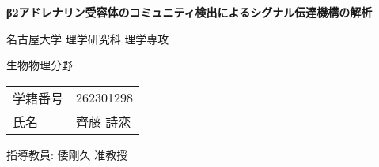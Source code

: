 \begin{titlepage}
    \centering
    \fontsize{24pt}{28pt}\selectfont
    \textbf{β2アドレナリン受容体のコミュニティ検出によるシグナル伝達機構の解析}
    \vspace{20pt}

    \fontsize{14pt}{18pt}\selectfont
    名古屋大学 理学研究科 理学専攻  
    \vspace{15pt}

    生物物理分野  
    \vspace{15pt}

    \fontsize{12pt}{16pt}\selectfont
    \begin{tabular}{ll}
        学籍番号 & 262301298 \\
        氏名   & 齊藤 詩恋 \\
    \end{tabular}
    \vspace{20pt}

    指導教員: 倭剛久 准教授
    \vspace{45pt}

\end{titlepage}
